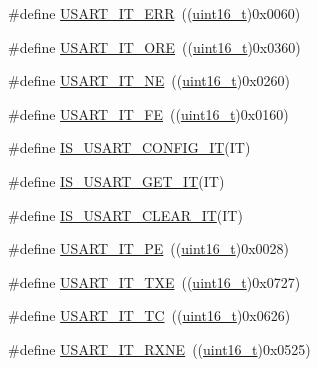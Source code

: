 \begin{DoxyCompactItemize}
\#define \hyperlink{group___u_s_a_r_t___interrupt__definition_ga631e83efd4c4789128d80a9539faf78a}{U\+S\+A\+R\+T\+\_\+\+I\+T\+\_\+\+E\+RR}~((\hyperlink{_p_e___types_8h_a1f1825b69244eb3ad2c7165ddc99c956}{uint16\+\_\+t})0x0060)
\item 
\#define \hyperlink{group___u_s_a_r_t___interrupt__definition_ga8b7d40e02a81be787fbb325bbe6dfbeb}{U\+S\+A\+R\+T\+\_\+\+I\+T\+\_\+\+O\+RE}~((\hyperlink{_p_e___types_8h_a1f1825b69244eb3ad2c7165ddc99c956}{uint16\+\_\+t})0x0360)
\item 
\#define \hyperlink{group___u_s_a_r_t___interrupt__definition_gad5de042f579b50f1e8643009176486b3}{U\+S\+A\+R\+T\+\_\+\+I\+T\+\_\+\+NE}~((\hyperlink{_p_e___types_8h_a1f1825b69244eb3ad2c7165ddc99c956}{uint16\+\_\+t})0x0260)
\item 
\#define \hyperlink{group___u_s_a_r_t___interrupt__definition_ga9af8790f78f6cb1591506c57d0cc0fb3}{U\+S\+A\+R\+T\+\_\+\+I\+T\+\_\+\+FE}~((\hyperlink{_p_e___types_8h_a1f1825b69244eb3ad2c7165ddc99c956}{uint16\+\_\+t})0x0160)
\item 
\#define \hyperlink{group___u_s_a_r_t___interrupt__definition_ga37ce140eae1938a414ff32afed5ef236}{I\+S\+\_\+\+U\+S\+A\+R\+T\+\_\+\+C\+O\+N\+F\+I\+G\+\_\+\+IT}(IT)
\item 
\#define \hyperlink{group___u_s_a_r_t___interrupt__definition_ga9a8014793a383d710eaaf4185f2b795d}{I\+S\+\_\+\+U\+S\+A\+R\+T\+\_\+\+G\+E\+T\+\_\+\+IT}(IT)
\item 
\#define \hyperlink{group___u_s_a_r_t___interrupt__definition_ga3ceda175140b84eea02a2261ebda4efd}{I\+S\+\_\+\+U\+S\+A\+R\+T\+\_\+\+C\+L\+E\+A\+R\+\_\+\+IT}(IT)
\item 
\#define \hyperlink{group___u_s_a_r_t___interrupt__definition_gae607c28a462c224c575b7541dc4f7067}{U\+S\+A\+R\+T\+\_\+\+I\+T\+\_\+\+PE}~((\hyperlink{_p_e___types_8h_a1f1825b69244eb3ad2c7165ddc99c956}{uint16\+\_\+t})0x0028)
\item 
\#define \hyperlink{group___u_s_a_r_t___interrupt__definition_gab18d0fe889204a4c34f6d5817fb5147d}{U\+S\+A\+R\+T\+\_\+\+I\+T\+\_\+\+T\+XE}~((\hyperlink{_p_e___types_8h_a1f1825b69244eb3ad2c7165ddc99c956}{uint16\+\_\+t})0x0727)
\item 
\#define \hyperlink{group___u_s_a_r_t___interrupt__definition_ga748e86162cc110513330079982821c39}{U\+S\+A\+R\+T\+\_\+\+I\+T\+\_\+\+TC}~((\hyperlink{_p_e___types_8h_a1f1825b69244eb3ad2c7165ddc99c956}{uint16\+\_\+t})0x0626)
\item 
\#define \hyperlink{group___u_s_a_r_t___interrupt__definition_gacdd49b93072655a21a63a35e6431f8ae}{U\+S\+A\+R\+T\+\_\+\+I\+T\+\_\+\+R\+X\+NE}~((\hyperlink{_p_e___types_8h_a1f1825b69244eb3ad2c7165ddc99c956}{uint16\+\_\+t})0x0525)

\end{DoxyCompactItemize}
